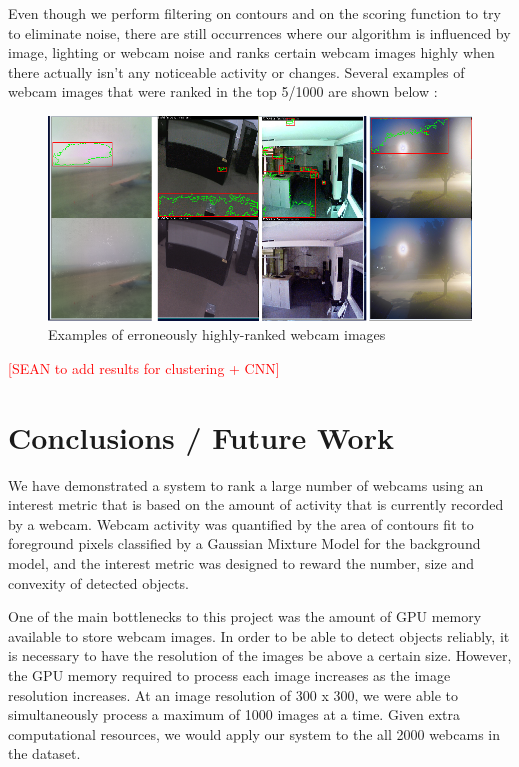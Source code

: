 \documentclass[10pt]{article} %
\begin{document}
Even though we perform filtering on contours and on the scoring function to try to eliminate noise, there are still occurrences where our algorithm is influenced by image, lighting or webcam noise and ranks certain webcam images highly when there actually isn't any noticeable activity or changes. Several examples of webcam images that were ranked in the top 5/1000 are shown below :
\begin{figure}[H]
\centering
\caption{Examples of erroneously highly-ranked webcam images}
\includegraphics[scale = 0.5]{fails}
\end{figure}

\textcolor{red}{[SEAN to add results for clustering + CNN]}

\section{Conclusions / Future Work}
We have demonstrated a system to rank a large number of webcams using an interest metric that is based on the amount of activity that is currently recorded by a webcam. Webcam activity was quantified by the area of contours fit to foreground pixels classified by a Gaussian Mixture Model for the background model, and the interest metric was designed to reward the number, size and convexity of detected objects. 

One of the main bottlenecks to this project was the amount of GPU memory available to store webcam images. In order to be able to detect objects reliably, it is necessary to have the resolution of the images be above a certain size. However, the GPU memory required to process each image increases as the image resolution increases. At an image resolution of 300 x 300, we were able to simultaneously process a maximum of 1000 images at a time. Given extra computational resources, we would apply our system to the all 2000 webcams in the dataset.
\end{document}
